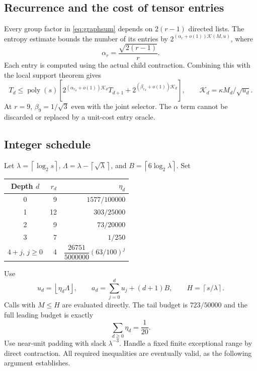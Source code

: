 \documentclass[11pt]{article}
\theoremstyle{definition}\newtheorem{definition}[theorem]{Definition}
\theoremstyle{remark}\newtheorem{remark}[theorem]{Remark}
\newcommand{\poly}{\operatorname{poly}}
\newcommand{\K}{\mathcal K}
\newcommand{\ceil}[1]{\left\lceil#1\right\rceil}
\newcommand{\floor}[1]{\left\lfloor#1\right\rfloor}
\begin{document}
\subsection{Recurrence and the cost of tensor entries}
Every group factor in \eqref{eq:graphsum} depends on $2(r-1)$ directed
lists. The entropy estimate bounds the number of its entries by
$2^{(\alpha_r+o(1))\K(M,u)}$, where
\[
 \alpha_r=\frac{\sqrt{2(r-1)}}r.
\]
Each entry is computed using the actual child contraction. Combining this
with the local support theorem gives
\begin{equation}\label{eq:recurrence}
 T_d\le\poly(s)\left[
  2^{(\alpha_{r_d}+o(1))\K_d}T_{d+1}
  +2^{(\beta_{r_d}+o(1))\K_d}\right],
 \qquad \K_d=\kappa M_d/\sqrt{u_d}.
\end{equation}
At $r=9$, $\beta_9=1/\sqrt3$ even with the joint selector.
The $\alpha$ term cannot be discarded or replaced by a unit-cost entry oracle.

\subsection{Integer schedule}
Let $\lambda=\ceil{\log_2s}$, $\Lambda=\lambda-\ceil{\sqrt\lambda}$,
and $B=\ceil{6\log_2\lambda}$. Set
\begin{center}
\begin{tabular}{crr}
\toprule Depth $d$ & $r_d$ & $\eta_d$\\\midrule
0&9&$1577/100000$\\
1&12&$303/25000$\\
2&9&$73/20000$\\
3&7&$1/250$\\
$4+j$, $j\ge0$&4&$\dfrac{26751}{5000000}(63/100)^j$\\\bottomrule
\end{tabular}
\end{center}
Use
\begin{equation}\label{eq:integerparams}
 u_d=\floor{\eta_d\Lambda},\qquad
 a_d=\sum_{j=0}^d u_j+(d+1)B,\qquad
 H=\ceil{s/\lambda}.
\end{equation}
Calls with $M\le H$ are evaluated directly. The tail budget is
$723/50000$ and the full leading budget is exactly
\begin{equation}\label{eq:budget}
 \sum_{d\ge0}\eta_d=\frac1{20}.
\end{equation}
Use near-unit padding with slack $\lambda^{-3}$. Handle a fixed finite
exceptional range by direct contraction. All required inequalities are
eventually valid, as the following argument establishes.
\end{document}
